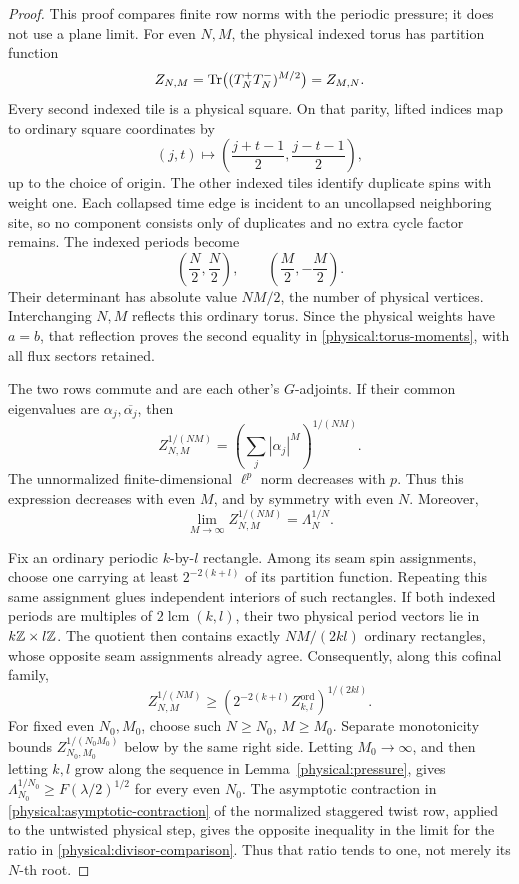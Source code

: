 \begin{proof}
This proof compares finite row norms with the periodic pressure; it
does not use a plane limit.
For even \(N,M\), the physical indexed torus has partition function
\begin{equation}\label{physical:torus-moments}
 Z_{N,M}=\operatorname{Tr}\bigl((T_N^+T_N^-)^{M/2}\bigr)=Z_{M,N}.
\end{equation}
Every second indexed tile is a physical square.  On that parity, lifted
indices map to ordinary square coordinates by
\[
 (j,t)\longmapsto\left(\frac{j+t-1}{2},\frac{j-t-1}{2}\right),
\]
up to the choice of origin.  The other indexed tiles identify duplicate
spins with weight one.  Each collapsed time edge is incident to an
uncollapsed neighboring site, so no component consists only of duplicates
and no extra cycle factor remains.  The indexed periods become
\[
 \left(\frac N2,\frac N2\right),\qquad
 \left(\frac M2,-\frac M2\right).
\]
Their determinant has absolute value \(NM/2\), the number of physical
vertices.  Interchanging \(N,M\) reflects this ordinary torus.  Since
the physical weights have \(a=b\), that reflection proves the second
equality in \eqref{physical:torus-moments}, with all flux sectors retained.

The two rows commute and are each other's \(G\)-adjoints. If their
common eigenvalues are \(\alpha_j,\overline{\alpha_j}\), then
\[
 Z_{N,M}^{1/(NM)}=
 \left(\sum_j|\alpha_j|^M\right)^{1/(NM)}.
\]
The unnormalized finite-dimensional \(\ell^p\) norm decreases with
\(p\). Thus this expression decreases with even \(M\), and by
symmetry with even \(N\). Moreover,
\[
 \lim_{M\to\infty}Z_{N,M}^{1/(NM)}=\Lambda_N^{1/N}.
\]

Fix an ordinary periodic \(k\)-by-\(l\) rectangle. Among its seam
spin assignments, choose one carrying at least
\(2^{-2(k+l)}\) of its partition function. Repeating this same
assignment glues independent interiors of such rectangles.  If both
indexed periods are multiples of \(2\operatorname{lcm}(k,l)\), their
two physical period vectors lie in \(k\mathbb Z\times l\mathbb Z\).  The quotient
then contains exactly \(NM/(2kl)\) ordinary rectangles, whose opposite
seam assignments already agree.  Consequently, along this cofinal family,
\[
 Z_{N,M}^{1/(NM)}
 \ge \left(2^{-2(k+l)}Z^{\mathrm{ord}}_{k,l}\right)^{1/(2kl)}.
\]
For fixed even \(N_0,M_0\), choose such \(N\ge N_0\), \(M\ge M_0\).
Separate monotonicity bounds \(Z_{N_0,M_0}^{1/(N_0M_0)}\) below by the
same right side.  Letting \(M_0\to\infty\), and then letting \(k,l\)
grow along the sequence in Lemma~\ref{physical:pressure}, gives
\(\Lambda_{N_0}^{1/N_0}\ge F(\lambda/2)^{1/2}\) for every even \(N_0\).
The asymptotic contraction in \eqref{physical:asymptotic-contraction}
of the normalized staggered twist row,
applied to the untwisted physical step, gives the opposite inequality
in the limit for the ratio in \eqref{physical:divisor-comparison}.
Thus that ratio tends to one, not merely its \(N\)-th root.


\end{proof}
